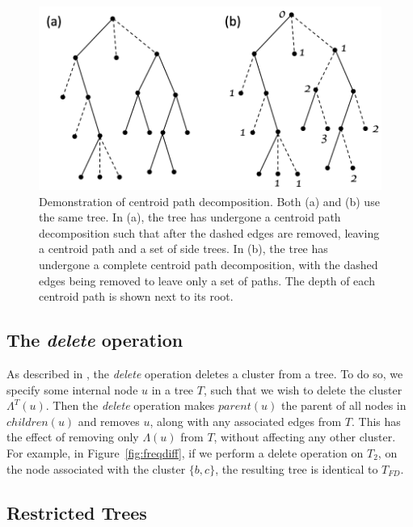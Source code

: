 \documentclass{article}
\newcommand{\leafset}{\Lambda}
\begin{document}
    \begin{figure}[ht]
        \includegraphics[scale=0.5]{centroid}
        \centering
        \caption[Centroid path decomposition]{Demonstration of centroid path decomposition. Both (a) and (b) use the same tree. In (a), the tree has undergone a centroid path decomposition such that after the dashed edges are removed, leaving a centroid path and a set of side trees. In (b), the tree has undergone a complete centroid path decomposition, with the dashed edges being removed to leave only a set of paths. The depth of each centroid path is shown next to its root.}
        \label{fig:centroid}
    \end{figure}

    \subsection{The \textit{delete} operation}
    \label{subsec:delete}

    As described in \cite{jansson2018algorithms}, the \textit{delete} operation deletes a cluster from a tree. To do so, we specify some internal node $u$ in a tree $T$, such that we wish to delete the cluster $\leafset^{T}(u)$. Then the \textit{delete} operation makes $parent(u)$ the parent of all nodes in $children(u)$ and removes $u$, along with any associated edges from $T$. This has the effect of removing only $\leafset(u)$ from $T$, without affecting any other cluster. For example, in Figure~\ref{fig:freqdiff}, if we perform a delete operation on $T_2$, on the node associated with the cluster $\{b, c\}$, the resulting tree is identical to $T_{FD}$.

    \subsection{Restricted Trees}
    \label{subsec:restrictedtree}
\end{document}
